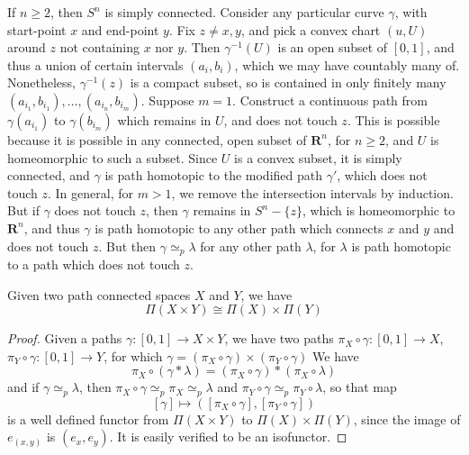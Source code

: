 \begin{example}
    If $n \geq 2$, then $S^n$ is simply connected. Consider any particular curve $\gamma$, with start-point $x$ and end-point $y$. Fix $z \neq x,y$, and pick a convex chart $(u,U)$ around $z$ not containing $x$ nor $y$. Then $\gamma^{-1}(U)$ is an open subset of $[0,1]$, and thus a union of certain intervals $(a_i,b_i)$, which we may have countably many of. Nonetheless, $\gamma^{-1}(z)$ is a compact subset, so is contained in only finitely many $(a_{i_1}, b_{i_1}), \dots, (a_{i_n}, b_{i_m})$. Suppose $m = 1$. Construct a continuous path from $\gamma(a_{i_1})$ to $\gamma(b_{i_m})$ which remains in $U$, and does not touch $z$. This is possible because it is possible in any connected, open subset of $\mathbf{R}^n$, for $n \geq 2$, and $U$ is homeomorphic to such a subset. Since $U$ is a convex subset, it is simply connected, and $\gamma$ is path homotopic to the modified path $\gamma'$, which does not touch $z$. In general, for $m > 1$, we remove the intersection intervals by induction. But if $\gamma$ does not touch $z$, then $\gamma$ remains in $S^n - \{ z \}$, which is homeomorphic to $\mathbf{R}^n$, and thus $\gamma$ is path homotopic to any other path which connects $x$ and $y$ and does not touch $z$. But then $\gamma \simeq_p \lambda$ for any other path $\lambda$, for $\lambda$ is path homotopic to a path which does not touch $z$.
\end{example}

\begin{theorem}
    Given two path connected spaces $X$ and $Y$, we have
    \[ \Pi(X \times Y) \cong \Pi(X) \times \Pi(Y) \]
\end{theorem}
\begin{proof}
    Given a paths $\gamma: [0,1] \to X \times Y$, we have two paths $\pi_X \circ \gamma: [0,1] \to X$, $\pi_Y \circ \gamma: [0,1] \to Y$, for which $\gamma = (\pi_X \circ \gamma) \times (\pi_Y \circ \gamma)$ We have
    \[ \pi_X \circ (\gamma * \lambda) = (\pi_X \circ \gamma) * (\pi_X \circ \lambda) \]
    and if $\gamma \simeq_p \lambda$, then $\pi_X \circ \gamma \simeq_p \pi_X \simeq_p \lambda$ and $\pi_Y \circ \gamma \simeq_p \pi_Y \circ \lambda$, so that map
    \[ [\gamma] \mapsto ([\pi_X \circ \gamma], [\pi_Y \circ \gamma]) \]
    is a well defined functor from $\Pi(X \times Y)$ to $\Pi(X) \times \Pi(Y)$, since the image of $e_{(x,y)}$ is $(e_x, e_y)$. It is easily verified to be an isofunctor.
\end{proof}

